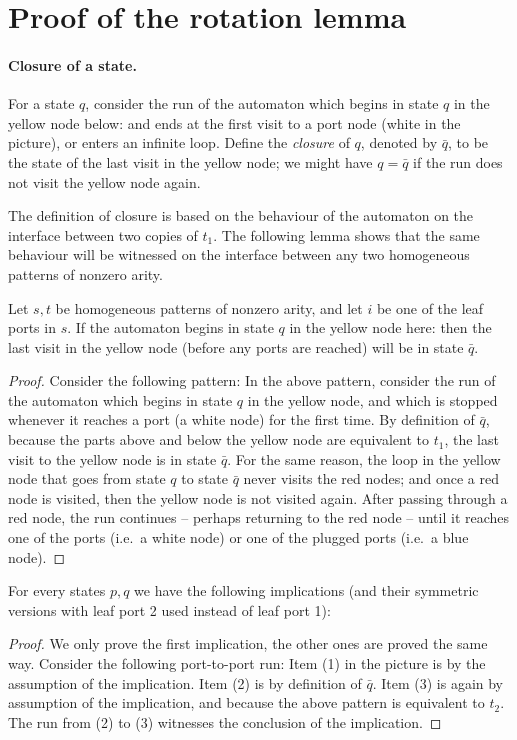 \section{Proof of the rotation lemma}
\paragraph*{Closure of a state.} 
For a state $q$, consider the run of the automaton which begins in state $q$ in the yellow node below:
and ends at the first visit to a port node (white in the picture), or enters an infinite loop.
Define the \emph{closure} of $q$, denoted by  $\bar q$, to be the state of the last visit in the yellow node; we might have $q = \bar q$ if the run does not visit the yellow node again.

The definition of closure is based on the behaviour of the automaton on the interface between two copies of $t_1$. The following lemma shows that the same behaviour will be witnessed on the interface between any two homogeneous patterns of nonzero arity.
\begin{lemma}\label{lem:twa-bar}
  Let $s,t$ be homogeneous patterns of nonzero arity, and let $i$ be one of the leaf ports in $s$. If the automaton begins in state $q$ in the yellow node here: 
  then the last visit in the yellow node (before any  ports are reached) will be in state $\bar q$.
\end{lemma}
\begin{proof} 
Consider the following pattern:
In the above pattern,  consider the run of the automaton which begins in state $q$ in the yellow node, and which is stopped whenever it reaches a port (a white node) for the first time.  By definition of $\bar q$, because the parts above and below the yellow node are equivalent to $t_1$, the last visit to  the  yellow node is   in state $\bar q$. For the same reason, the loop in the yellow node that goes from state $q$ to state $\bar q$ never visits the red nodes; and once a red node is visited, then the yellow node  is not visited again. After passing through a red node, the run continues -- perhaps returning to the red node -- until it reaches one of the ports (i.e.~a white node) or one of the plugged ports (i.e.~a blue node). 
\end{proof}





\begin{lemma}\label{lem:closure-up} For every states $p,q$ we have the following implications (and their symmetric versions with leaf port 2 used instead of leaf port 1):
\end{lemma}
\begin{proof}
We only prove the first implication, the other ones are proved the same way.
Consider the following port-to-port run:
Item (1) in the picture is by the assumption of the implication. Item (2) is by definition of $\bar q$. Item (3) is again by assumption of the implication, and because  the above pattern is equivalent to $t_2$. The run from (2) to (3) witnesses the conclusion of the implication. \end{proof}

